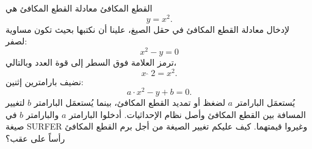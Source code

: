 \begin{surferPage}{القطع المكافئ}
معادلة القطع المكافئ هي  \[y=x^2.\]
لإدخال معادلة القطع المكافئ في حقل الصيغ، علينا أن نكتبها بحيث تكون مساوية لصفر:
\[x^2-y=0\]
ترمز العلامة فوق السطر إلى قوة العدد وبالتالي،
\[ x  \,\hat{\ } \, 2 =x^2.\]
نضيف بارامترين إثنين:
\[a \cdot x^2-y+b=0.\]
يُستعمَل البارامتر $a$ لضغظ أو تمديد القطع المكافئ، بينما يُستعمَل البارامتر $b$ لتغيير المسافة بين القطع المكافئ وأصل نظام الإحداثيات.
\newline
أدخلوا البارامتر $a$ والبارامتر $b$ في صيغة \textenglish{SURFER} وغيروا قيمتهما. كيف عليكم تغيير الصيغة من أجل برم القطع المكافئ رأساً على عقب؟
\end{surferPage}
